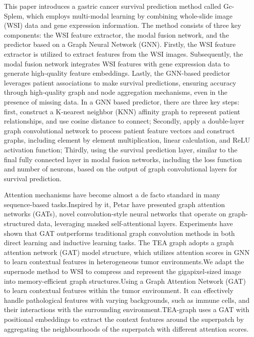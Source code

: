 \documentclass[journal,twoside,web]{ieeecolor}
\begin{document}
This paper introduces a gastric cancer survival prediction method called Gc-Splem\cite{xie2022survival}, which employs multi-modal learning by combining whole-slide image (WSI) data and gene expression information. The method consists of three key components: the WSI feature extractor, the modal fusion network, and the predictor based on a Graph Neural Network (GNN). Firstly, the WSI feature extractor is utilized to extract features from the WSI images. Subsequently, the modal fusion network integrates WSI features with gene expression data to generate high-quality feature embeddings. Lastly, the GNN-based predictor leverages patient associations to make survival predictions, ensuring accuracy through high-quality graph and node aggregation mechanisms, even in the presence of missing data. In a GNN based predictor, there are three key steps: first, construct a K-nearest neighbor (KNN) affinity graph to represent patient relationships, and use cosine distance to connect; Secondly, apply a double-layer graph convolutional network to process patient feature vectors and construct graphs, including element by element multiplication, linear calculation, and ReLU activation function; Thirdly, using the survival prediction layer, similar to the final fully connected layer in modal fusion networks, including the loss function and number of neurons, based on the output of graph convolutional layers for survival prediction.

Attention mechanisms have become almost a de facto standard in many sequence-based tasks.Inspired by it, Petar have presented graph attention networks (GATs)\cite{velickovic2017graph}, novel convolution-style neural networks that operate on graph-structured data, leveraging masked self-attentional layers. Experiments have shown that GAT outperforms traditional graph convolution methods in both direct learning and inductive learning tasks.
The TEA graph\cite{lee2022derivation} adopts a graph attention network (GAT) model structure, which utilizes attention scores in GNN to learn contextual features in heterogeneous tumor environments.We adapt the supernode method\cite{stanley2018compressing} to WSI to compress and represent the gigapixel-sized image into memory-efficient graph structures.Using a Graph Attention Network (GAT) to learn contextual features within the tumor environment. It can effectively handle pathological features with varying backgrounds, such as immune cells, and their interactions with the surrounding environment.TEA-graph uses a GAT with positional embeddings to extract the context features around the superpatch by aggregating the neighbourhoods of the superpatch with different attention scores.
\end{document}
